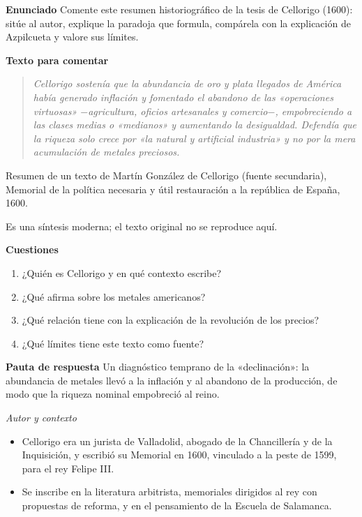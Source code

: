 \documentclass{book}
\begin{document}
\begin{tcolorbox}[title={Ejercicio resuelto}, studiumworked, breakable]

\noindent\textbf{Enunciado}
Comente este resumen historiográfico de la tesis de Cellorigo (1600): sitúe al autor, explique la paradoja que formula, compárela con la explicación de Azpilcueta y valore sus límites.


\noindent\textbf{Texto para comentar}

\begin{quote}
\itshape Cellorigo sostenía que la abundancia de oro y plata llegados de América había generado inflación y fomentado el abandono de las «operaciones virtuosas» \(-\)agricultura, oficios artesanales y comercio\(-\), empobreciendo a las clases medias o «medianos» y aumentando la desigualdad. Defendía que la riqueza solo crece por «la natural y artificial industria» y no por la mera acumulación de metales preciosos.
\end{quote}
{\noindent\footnotesize Resumen de un texto de Martín González de Cellorigo (fuente secundaria), Memorial de la política necesaria y útil restauración a la república de España, 1600.\par}
{\noindent\footnotesize Es una síntesis moderna; el texto original no se reproduce aquí.\par}

\noindent\textbf{Cuestiones}
\begin{enumerate}
\item ¿Quién es Cellorigo y en qué contexto escribe?
\item ¿Qué afirma sobre los metales americanos?
\item ¿Qué relación tiene con la explicación de la revolución de los precios?
\item ¿Qué límites tiene este texto como fuente?
\end{enumerate}

\noindent\textbf{Pauta de respuesta}
Un diagnóstico temprano de la «declinación»: la abundancia de metales llevó a la inflación y al abandono de la producción, de modo que la riqueza nominal empobreció al reino.


\noindent\textit{Autor y contexto}
\begin{itemize}
\item Cellorigo era un jurista de Valladolid, abogado de la Chancillería y de la Inquisición, y escribió su Memorial en 1600, vinculado a la peste de 1599, para el rey Felipe III.
\item Se inscribe en la literatura arbitrista, memoriales dirigidos al rey con propuestas de reforma, y en el pensamiento de la Escuela de Salamanca.
\end{itemize}


\end{tcolorbox}
\end{document}
